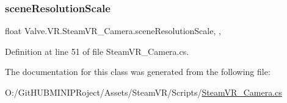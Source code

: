 \subsubsection{\texorpdfstring{sceneResolutionScale}{sceneResolutionScale}}
{\footnotesize\ttfamily float Valve.\+V\+R.\+Steam\+V\+R\+\_\+\+Camera.\+scene\+Resolution\+Scale\hspace{0.3cm}{\ttfamily [static]}, {\ttfamily [get]}, {\ttfamily [set]}}



Definition at line 51 of file Steam\+V\+R\+\_\+\+Camera.\+cs.



The documentation for this class was generated from the following file\+:\begin{DoxyCompactItemize}
\item 
O\+:/\+Git\+H\+U\+B\+M\+I\+N\+I\+P\+Roject/\+Assets/\+Steam\+V\+R/\+Scripts/\mbox{\hyperlink{_steam_v_r___camera_8cs}{Steam\+V\+R\+\_\+\+Camera.\+cs}}\end{DoxyCompactItemize}
